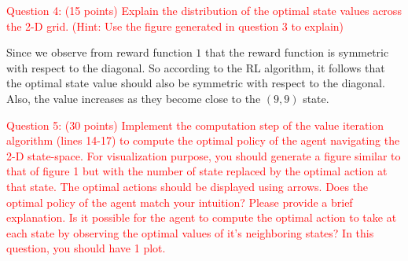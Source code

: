 \documentclass[11pt]{article}
\begin{document}
\textcolor{red}{
    Question 4: (15 points) Explain the distribution of the optimal state values across the 2-D grid. (Hint: Use the figure generated in question 3 to explain)
}

Since we observe from reward function $1$ that the reward function is symmetric with respect to the diagonal. So according to the RL algorithm, it follows that the optimal state value should also be symmetric with respect to the diagonal. Also, the value increases as they become close to the $(9,9)$ state.
\vspace{10pt}

\textcolor{red}{
    Question 5: (30 points) Implement the computation step of the value iteration algorithm (lines 14-17) to compute the optimal policy of the agent navigating
the 2-D state-space. For visualization purpose, you should generate a figure similar to that of figure 1 but with the number of state replaced by the optimal action at that state. The optimal actions should be displayed using arrows. Does the optimal policy of the agent match your intuition? Please provide a brief explanation. Is it possible for the agent to compute the optimal action to take at each state by observing the optimal values of it's neighboring states? In this question, you should have 1 plot.
}
\end{document}
